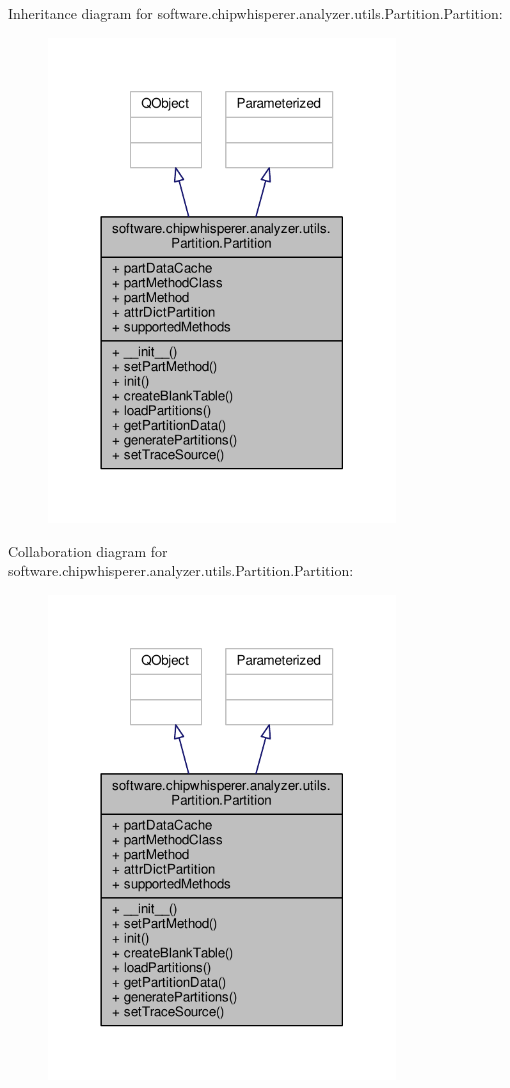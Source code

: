 Inheritance diagram for software.\+chipwhisperer.\+analyzer.\+utils.\+Partition.\+Partition\+:\nopagebreak
\begin{figure}[H]
\begin{center}
\leavevmode
\includegraphics[width=261pt]{d3/d06/classsoftware_1_1chipwhisperer_1_1analyzer_1_1utils_1_1Partition_1_1Partition__inherit__graph}
\end{center}
\end{figure}


Collaboration diagram for software.\+chipwhisperer.\+analyzer.\+utils.\+Partition.\+Partition\+:\nopagebreak
\begin{figure}[H]
\begin{center}
\leavevmode
\includegraphics[width=261pt]{da/d7a/classsoftware_1_1chipwhisperer_1_1analyzer_1_1utils_1_1Partition_1_1Partition__coll__graph}
\end{center}
\end{figure}


